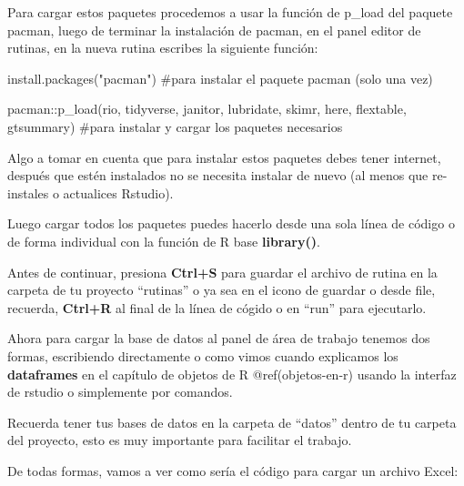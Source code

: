 \documentclass[
  letterpaper,
  DIV=11,
  numbers=noendperiod]{scrreprt}
\newenvironment{Shaded}{\begin{snugshade}}{\end{snugshade}}
\newcommand{\CommentTok}[1]{\textcolor[rgb]{0.37,0.37,0.37}{#1}}
\newcommand{\FunctionTok}[1]{\textcolor[rgb]{0.28,0.35,0.67}{#1}}
\newcommand{\NormalTok}[1]{\textcolor[rgb]{0.00,0.23,0.31}{#1}}
\newcommand{\SpecialCharTok}[1]{\textcolor[rgb]{0.37,0.37,0.37}{#1}}
\newcommand{\StringTok}[1]{\textcolor[rgb]{0.13,0.47,0.30}{#1}}
\begin{document}
Para cargar estos paquetes procedemos a usar la función de p\_load del
paquete pacman, luego de terminar la instalación de pacman, en el panel
editor de rutinas, en la nueva rutina escribes la siguiente función:

\begin{Shaded}
\begin{Highlighting}[]
\FunctionTok{install.packages}\NormalTok{(}\StringTok{"pacman"}\NormalTok{) }\CommentTok{\#para instalar el paquete pacman (solo una vez)}
\end{Highlighting}
\end{Shaded}

\begin{Shaded}
\begin{Highlighting}[]
\NormalTok{pacman}\SpecialCharTok{::}\FunctionTok{p\_load}\NormalTok{(rio, }
\NormalTok{               tidyverse, }
\NormalTok{               janitor, }
\NormalTok{               lubridate, }
\NormalTok{               skimr, }
\NormalTok{               here,}
\NormalTok{               flextable,}
\NormalTok{               gtsummary) }\CommentTok{\#para instalar y cargar los paquetes necesarios}
\end{Highlighting}
\end{Shaded}

Algo a tomar en cuenta que para instalar estos paquetes debes tener
internet, después que estén instalados no se necesita instalar de nuevo
(al menos que re-instales o actualices Rstudio).

Luego cargar todos los paquetes puedes hacerlo desde una sola línea de
código o de forma individual con la función de R base
\textbf{library()}.

Antes de continuar, presiona \textbf{Ctrl+S} para guardar el archivo de
rutina en la carpeta de tu proyecto ``rutinas'' o ya sea en el icono de
guardar o desde file, recuerda, \textbf{Ctrl+R} al final de la línea de
cógido o en ``run'' para ejecutarlo.

Ahora para cargar la base de datos al panel de área de trabajo tenemos
dos formas, escribiendo directamente o como vimos cuando explicamos los
\textbf{dataframes} en el capítulo de objetos de R @ref(objetos-en-r)
usando la interfaz de rstudio o simplemente por comandos.

Recuerda tener tus bases de datos en la carpeta de ``datos'' dentro de
tu carpeta del proyecto, esto es muy importante para facilitar el
trabajo.

De todas formas, vamos a ver como sería el código para cargar un archivo
Excel:
\end{document}
